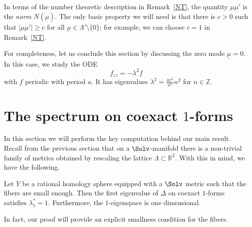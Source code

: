 In terms of the number theoretic description in Remark~\ref{NT}, the quantity $\mu\mu'$ is the \emph{norm} $N(\underline{\mu})$. The only basic property we will need is that there is $c>0$ such that $|\mu\mu'|\geq c$ for all $\underline{\mu}\in \Lambda'\setminus \{0\}$; for example, we can choose $c=1$ in Remark~\ref{NT}.


For completeness, let us conclude this section by discussing the zero mode $\underline{\mu}=0$. In this case, we study the ODE
\[
f_{zz}=-\lambda^2 f
\]
with $f$ periodic with period $a$. It has eigenvalues $\lambda^2=\frac{4\pi^2}{a^2} n^2$ for $n\in\mathbb{Z}$.



\section{The spectrum on coexact \texorpdfstring{$1$}{1}-forms}\label{spectralbound}
In this section we will perform the key computation behind our main result. Recall from the previous section that on a $\Solv$-manifold there is a non-trivial family of metrics obtained by rescaling the lattice $\Lambda\subset \mathbb{R}^2$. With this in mind, we have the following.

\begin{prop}\label{maineigen}
Let $Y$ be a rational homology sphere equipped with a $\Solv$ metric such that the fibers are small enough. Then the first eigenvalue of $\Delta$ on coexact $1$-forms satisfies $\lambda_1^*=1$. Furthermore, the $1$-eigenspace is one dimensional.
\end{prop}

In fact, our proof will provide an explicit smallness condition for the fibers.



